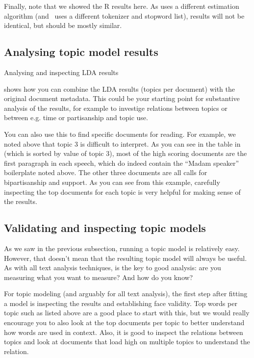 Finally, note that we showed the R results here. As  uses a different estimation algorithm
(and \sklearn\ uses a different tokenizer and stopword list), results will not be identical,
but should be mostly similar. 

\subsection{Analysing topic model results}

\begin{ccsexample}
\caption{Analysing and inspecting LDA results}\label{ex:ldaresults}
\end{ccsexample}


 shows how you can combine the LDA results (topics per document)
with the original document metadata.
This could be your starting point for substantive analysis of the results,
for example to investige relations between topics or between e.g. time or partisanship and topic use.

You can also use this to find specific documents for reading.
For example, we noted above that topic 3 is difficult to interpret.
As you can see in the table in  (which is sorted by value of topic 3),
most of the high scoring documents are the first paragraph in each speech,
which do indeed contain the ``Madam speaker'' boilerplate noted above.
The other three documents are all calls for bipartisanship and support.
As you can see from this example, carefully inspecting the top documents for each topic
is very helpful for making sense of the results.


\subsection{Validating and inspecting topic models}

As we saw in the previous subsection, running a topic model is relatively easy.
However, that doesn't mean that the resulting topic model will always be useful.
As with all text analysis techniques,  is the key to good analysis:
are you measuring what you want to measure? And how do you know?

For topic modeling (and arguably for all text analysis),
the first step after fitting a model is inspecting the results and establishing face validity.
Top words per topic such as listed above are a good place to start with this,
but we would really encourage you to also look at the top documents per topic to better understand how words are used in context.
Also, it is good to inspect the relations between topics and look at documents that load high on multiple topics to understand the relation.

